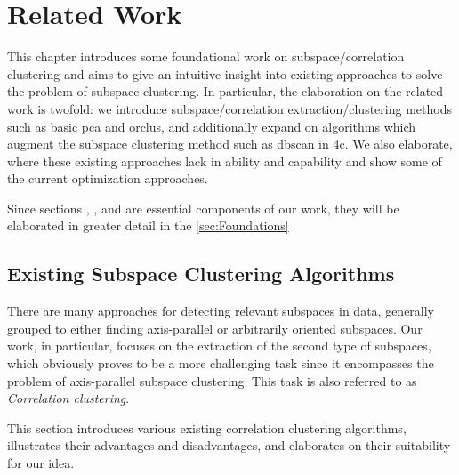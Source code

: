 \chapter{Related Work}
\label{sec:Related Work}
This chapter introduces some foundational work on subspace/correlation clustering and aims to give an intuitive insight into existing approaches to solve the problem of subspace clustering. In particular, the elaboration on the related work is twofold: we introduce subspace/correlation extraction/clustering methods such as basic \acrshort{pca} and \acrshort{orclus}, and additionally expand on algorithms which augment the subspace clustering method such as \acrshort{dbscan} in \acrshort{4c}. We also elaborate, where these existing approaches lack in ability and capability and show some of the current optimization approaches.

Since sections , ,  and  are essential components of our work, they will be elaborated in greater detail in the \autoref{sec:Foundations} 

\section{Existing Subspace Clustering Algorithms}
There are many approaches for detecting relevant subspaces in data, generally grouped to either finding axis-parallel or arbitrarily oriented subspaces. Our work, in particular, focuses on the extraction of the second type of subspaces, which obviously proves to be a more challenging task since it encompasses the problem of axis-parallel subspace clustering. This task is also referred to as \textit{Correlation clustering}. 

This section introduces various existing correlation clustering algorithms, illustrates their advantages and disadvantages, and elaborates on their suitability for our idea.

